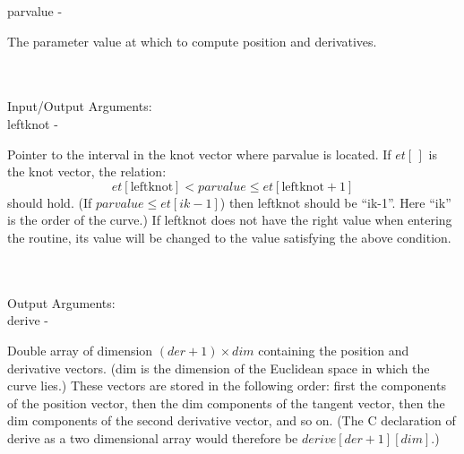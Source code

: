         \>\>    {\fov parvalue}\> - \>  \begin{minipg2}
                                The parameter value at which to compute position
                                and derivatives.
                                \end{minipg2}\\[0.3ex]
\\
        \>Input/Output Arguments:\\
        \>\>    {\fov leftknot}\> - \>  \begin{minipg2}
                                Pointer to the interval in the knot
                                vector where {\fov parvalue}
                                is located. If $et[\,]$ is the knot vector, the relation:\\
                                \[ et[\mbox{leftknot}] < parvalue \leq et[\mbox{leftknot}+1] \]
                                should hold. (If $parvalue\leq
                                et[ik-1]$) then {\fov leftknot} should be
                                ``ik-1''. Here ``ik'' is the order of the curve.)
                                If leftknot does not have the right value when entering
                                the routine, its value will be changed to the value
                                satisfying the above condition.
                                \end{minipg2}\\[0.3ex]
\\
\newpagetabs
        \>Output Arguments:\\
        \>\>    {\fov derive}   \> - \> \begin{minipg2}
                                        Double array of dimension $(der+1)\times dim$
                                        containing the position and derivative vectors.
                                        ({\fov dim} is
                                         the dimension of the Euclidean
                                        space in which the curve lies.) These vectors are
                                        stored in the following order: first the
                                        components of the position vector, then the dim
                                        components of the tangent vector, then the dim
                                        components of the second derivative vector, and so
                                        on. (The C declaration of derive as a two dimensional
                                        array would therefore be
                                        $derive[der+1][dim]$.)
                                \end{minipg2}\\[0.3ex]
